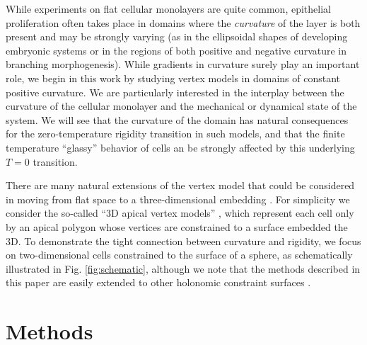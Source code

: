 \documentclass[aps,pre,reprint,superscriptaddress,nofootinbib]{revtex4-2}
\begin{document}
While experiments on flat cellular monolayers are quite common, epithelial proliferation often takes place in domains where the \emph{curvature} of the layer is both present and may be strongly varying (as in the ellipsoidal shapes of developing embryonic systems or in the regions of both positive and negative curvature in branching morphogenesis). While gradients in curvature surely play an important role, we begin in this work by studying vertex models in domains of constant positive curvature. We are particularly interested in the interplay between the curvature of the cellular monolayer and the mechanical or dynamical state of the system. We will see that the curvature of the domain has natural consequences for the zero-temperature rigidity transition in such models, and that the finite temperature ``glassy'' behavior of cells an be strongly affected by this underlying $T=0$ transition.

There are many natural extensions of the vertex model that could be considered in moving from flat space to a three-dimensional embedding \cite{alt2017vertex,okuda2015three,Fletcher2014,osterfield2013three,murisic2015discrete}. For simplicity we consider the so-called ``3D apical vertex models'' \cite{alt2017vertex}, which represent each cell only by an apical polygon whose vertices are constrained to a surface embedded the 3D. To demonstrate the tight connection between curvature and rigidity, we focus on two-dimensional cells constrained to the surface of a sphere, as schematically illustrated in Fig. \ref{fig:schematic}, although we note that the methods described in this paper are easily extended to other holonomic constraint surfaces \cite{SAMOS}.


\section{Methods}
\end{document}
